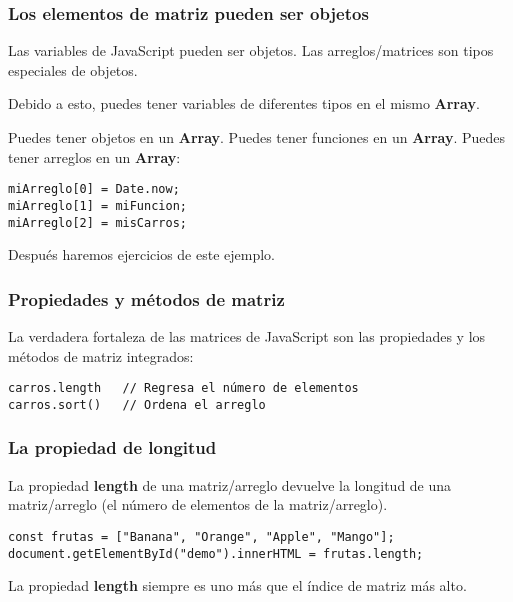 \begin{frame}[fragile]
  \frametitle{Los elementos de matriz pueden ser objetos}

  Las variables de JavaScript pueden ser objetos.
  Las arreglos/matrices son tipos especiales de objetos.

  Debido a esto, puedes tener variables de diferentes
  tipos en el mismo \textbf{Array}.

  Puedes tener objetos en un \textbf{Array}. Puedes tener
  funciones en un \textbf{Array}. Puedes tener arreglos en
  un \textbf{Array}:

  \vspace{\baselineskip}
  \begin{lstlisting}
miArreglo[0] = Date.now;
miArreglo[1] = miFuncion;
miArreglo[2] = misCarros;
  \end{lstlisting}

  Después haremos ejercicios de este ejemplo.
\end{frame}

\begin{frame}[fragile]
  \frametitle{Propiedades y métodos de matriz}

  La verdadera fortaleza de las matrices de JavaScript
  son las propiedades y los métodos de matriz integrados:

  \vspace{\baselineskip}
  \begin{lstlisting}
carros.length   // Regresa el número de elementos
carros.sort()   // Ordena el arreglo
  \end{lstlisting}
\end{frame}

\begin{frame}[fragile]
  \frametitle{La propiedad de longitud}

  La propiedad \textbf{length} de una matriz/arreglo devuelve la
  longitud de una matriz/arreglo (el número de elementos de
  la matriz/arreglo).

  \vspace{\baselineskip}
  \begin{lstlisting}
const frutas = ["Banana", "Orange", "Apple", "Mango"];
document.getElementById("demo").innerHTML = frutas.length;
  \end{lstlisting}


  \begin{block}{}
    La propiedad \textbf{length} siempre es uno más que el índice
    de matriz más alto.
  \end{block}
\end{frame}

